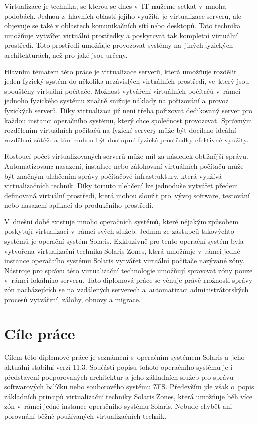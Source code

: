 \label{chapter:introduction}
Virtualizace je technika, se kterou se dnes v~IT můžeme setkat v~mnoha podobách. Jednou z~hlavních oblastí jejího využití,
je virtualizace serverů, ale objevuje se také v oblastech komunikačních sítí nebo desktopů. Tato technika umožňuje vytvářet
virtuální prostředky a poskytovat tak kompletní virtuální prostředí. Toto prostředí umožňuje provozovat systémy na~jiných
fyzických architekturách, než pro jaké jsou určeny.

Hlavním tématem této práce je virtualizace serverů, která umožňuje rozdělit jeden fyzický systém do několika nezávislých virtuálních
prostředí, ve~který jsou spouštěny virtuální počítače. Možnost vytváření virtuálních počítačů v~rámci jednoho fyzického systému
značně snižuje náklady na pořizování a~provoz fyzických serverů. Díky virtualizaci již není třeba pořizovat dedikovaný server pro
každou instanci operačního systému, který chce společnost provozovat. Správným rozdělením virtuálních počítačů na fyzické servery může být
docíleno ideální rozdělení zátěže a tím mohou být dostupné fyzické prostředky efektivně využity.

Rostoucí počet virtualizovaných serverů může mít za následek obtížnější správu. Automatizované nasazení, instalace nebo
zálohování virtuálních počítačů může být značným ulehčením správy počítačové infrastruktury, která využívá virtualizačních technik.
Díky tomuto ulehčení lze jednoduše vytvářet předem definovaná virtuální prostředí, která mohou sloužit pro~vývoj software, testování
nebo nasazení aplikací do produkčního prostředí. 

V~dnešní době existuje mnoho operačních systémů, které nějakým způsobem poskytují virtualizaci v~rámci svých služeb. Jedním ze zástupců
takovýchto systémů je operační systém Solaris. Exkluzivně pro tento operační systém byla vytvořena virtualizační technika Solaris
Zones, která umožňuje v~rámci jedné instance operačního systému Solaris vytvářet virtuální počítače nazývané zóny. Nástroje pro správu
této virtualizační technologie umožňují spravovat zóny pouze v~rámci lokálního serveru. Tato diplomová práce se věnuje právě možnosti
správy zón nacházejících se na vzdálených serverech a~automatizaci administrátorských procesů vytváření, zálohy, obnovy a migrace.
\section{Cíle práce}
\label{chapter:introduction:goals}
Cílem této diplomové práce je seznámení s~operačním systémem Solaris a~jeho aktuální stabilní verzí 11.3. Součástí popisu tohoto
operačního systému je i představení podporovaných architektur a jeho základních služeb pro správu softwarových balíčku nebo souborového
systému ZFS. Především jde však o~popis základních principů virtualizační techniky Solaris Zones, která umožňuje běh více zón v~rámci 
jedné instance operačního systému Solaris. Nebude chybět ani porovnání běžně používaných virtualizačních technik.

